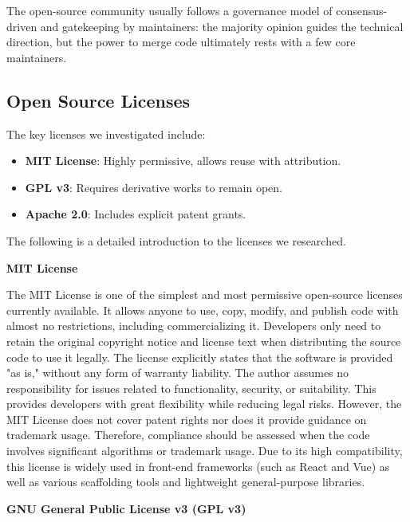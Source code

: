 \documentclass[12pt]{article}
\begin{document}
The open-source community usually follows a governance model of consensus-driven and gatekeeping by maintainers: the majority opinion guides the technical direction, but the power to merge code ultimately rests with a few core maintainers.

\subsection{Open Source Licenses}
The key licenses we investigated include:

\begin{itemize}
    \item \textbf{MIT License}: Highly permissive, allows reuse with attribution.
    \item \textbf{GPL v3}: Requires derivative works to remain open.
    \item \textbf{Apache 2.0}: Includes explicit patent grants.
\end{itemize}
    The following is a detailed introduction to the licenses we researched.
    
    \noindent\textbf{MIT License}

    The MIT License is one of the simplest and most permissive open-source licenses currently available. It allows anyone to use, copy, modify, and publish code with almost no restrictions, including commercializing it. Developers only need to retain the original copyright notice and license text when distributing the source code to use it legally. The license explicitly states that the software is provided "as is," without any form of warranty liability. The author assumes no responsibility for issues related to functionality, security, or suitability. This provides developers with great flexibility while reducing legal risks. However, the MIT License does not cover patent rights nor does it provide guidance on trademark usage. Therefore, compliance should be assessed when the code involves significant algorithms or trademark usage. Due to its high compatibility, this license is widely used in front-end frameworks (such as React and Vue) as well as various scaffolding tools and lightweight general-purpose libraries.

    \noindent\textbf{GNU General Public License v3 (GPL v3)}
\end{document}
